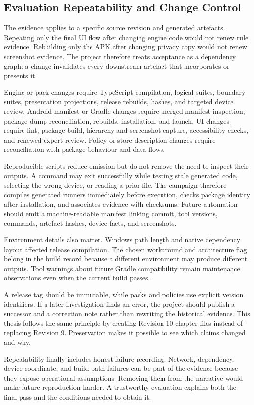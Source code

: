 \subsection{Evaluation Repeatability and Change Control}

The evidence applies to a specific source revision and generated artefacts. Repeating only the final UI flow after changing engine code would not renew rule evidence. Rebuilding only the APK after changing privacy copy would not renew screenshot evidence. The project therefore treats acceptance as a dependency graph: a change invalidates every downstream artefact that incorporates or presents it.

Engine or pack changes require TypeScript compilation, logical suites, boundary suites, presentation projections, release rebuilds, hashes, and targeted device review. Android manifest or Gradle changes require merged-manifest inspection, package dump reconciliation, rebuilds, installation, and launch. UI changes require lint, package build, hierarchy and screenshot capture, accessibility checks, and renewed expert review. Policy or store-description changes require reconciliation with package behaviour and data flows.

Reproducible scripts reduce omission but do not remove the need to inspect their outputs. A command may exit successfully while testing stale generated code, selecting the wrong device, or reading a prior file. The campaign therefore compiles generated runners immediately before execution, checks package identity after installation, and associates evidence with checksums. Future automation should emit a machine-readable manifest linking commit, tool versions, commands, artefact hashes, device facts, and screenshots.

Environment details also matter. Windows path length and native dependency layout affected release compilation. The chosen workaround and architecture flag belong in the build record because a different environment may produce different outputs. Tool warnings about future Gradle compatibility remain maintenance observations even when the current build passes.

A release tag should be immutable, while packs and policies use explicit version identifiers. If a later investigation finds an error, the project should publish a successor and a correction note rather than rewriting the historical evidence. This thesis follows the same principle by creating Revision 10 chapter files instead of replacing Revision 9. Preservation makes it possible to see which claims changed and why.

Repeatability finally includes honest failure recording. Network, dependency, device-coordinate, and build-path failures can be part of the evidence because they expose operational assumptions. Removing them from the narrative would make future reproduction harder. A trustworthy evaluation explains both the final pass and the conditions needed to obtain it.
